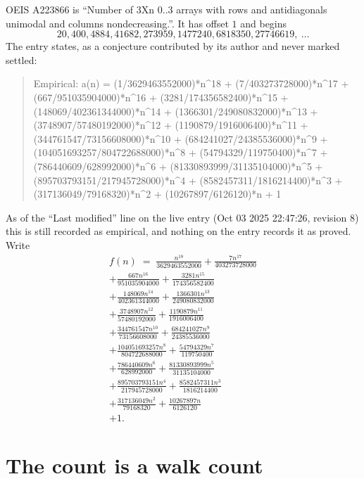 \documentclass[11pt,a4paper]{article}
\theoremstyle{plain}
\theoremstyle{definition}
\begin{document}
OEIS A223866 is ``Number of 3Xn 0..3 arrays with rows and antidiagonals unimodal and columns nondecreasing.''. It has offset $1$ and begins
\[
20, 400, 4884, 41682, 273959, 1477240, 6818350, 27746619,\ \dots
\]
The entry states, as a conjecture contributed by its author and never marked settled:
\begin{quote}\raggedright\small
Empirical: a(n) = (1/3629463552000)*n\^{}18 + (7/403273728000)*n\^{}17 + (667/951035904000)*n\^{}16 + (3281/174356582400)*n\^{}15 + (148069/402361344000)*n\^{}14 + (1366301/249080832000)*n\^{}13 + (3748907/57480192000)*n\^{}12 + (1190879/1916006400)*n\^{}11 + (344761547/73156608000)*n\^{}10 + (684241027/24385536000)*n\^{}9 + (104051693257/804722688000)*n\^{}8 + (54794329/119750400)*n\^{}7 + (786440609/628992000)*n\^{}6 + (81330893999/31135104000)*n\^{}5 + (895703793151/217945728000)*n\^{}4 + (8582457311/1816214400)*n\^{}3 + (317136049/79168320)*n\^{}2 + (10267897/6126120)*n + 1
\end{quote}
As of the ``Last modified'' line on the live entry (Oct 03 2025 22:47:26, revision 8) this is still
recorded as empirical, and nothing on the entry records it as proved. Write
\begin{multline*}
f(n)\;=\;\frac{n^{18}}{3629463552000} + \frac{7 n^{17}}{403273728000} \\
+ \frac{667 n^{16}}{951035904000} + \frac{3281 n^{15}}{174356582400} \\
+ \frac{148069 n^{14}}{402361344000} + \frac{1366301 n^{13}}{249080832000} \\
+ \frac{3748907 n^{12}}{57480192000} + \frac{1190879 n^{11}}{1916006400} \\
+ \frac{344761547 n^{10}}{73156608000} + \frac{684241027 n^{9}}{24385536000} \\
+ \frac{104051693257 n^{8}}{804722688000} + \frac{54794329 n^{7}}{119750400} \\
+ \frac{786440609 n^{6}}{628992000} + \frac{81330893999 n^{5}}{31135104000} \\
+ \frac{895703793151 n^{4}}{217945728000} + \frac{8582457311 n^{3}}{1816214400} \\
+ \frac{317136049 n^{2}}{79168320} + \frac{10267897 n}{6126120} \\
+ 1.
\end{multline*}

\section{The count is a walk count}
\end{document}
